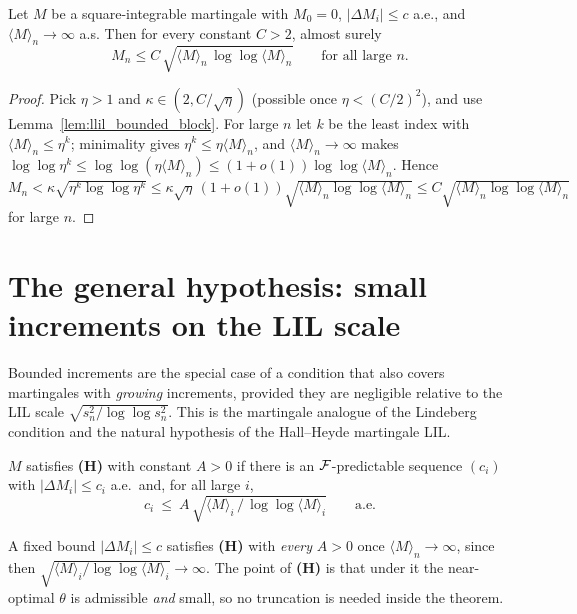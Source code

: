 \begin{theorem}\label{thm:llil_bounded}
\leanok
{}
Let $M$ be a square-integrable martingale with $M_0=0$, $|\Delta M_i|\le c$ a.e., and
$\langle M\rangle_n\to\infty$ a.s. Then for every constant $C>2$, almost surely
\[
  M_n\le C\,\sqrt{\langle M\rangle_n\,\log\log\langle M\rangle_n}\qquad
  \text{for all large }n.
\]
\end{theorem}
\begin{proof}\leanok
Pick $\eta>1$ and $\kappa\in(2,C/\sqrt\eta)$ (possible once $\eta<(C/2)^2$), and use
Lemma~\ref{lem:llil_bounded_block}. For large $n$ let $k$ be the least index with
$\langle M\rangle_n\le\eta^k$; minimality gives $\eta^k\le\eta\langle M\rangle_n$, and
$\langle M\rangle_n\to\infty$ makes $\log\log\eta^k\le\log\log(\eta\langle M\rangle_n)
\le(1+o(1))\log\log\langle M\rangle_n$. Hence
$M_n<\kappa\sqrt{\eta^k\log\log\eta^k}\le\kappa\sqrt\eta\,(1+o(1))
\sqrt{\langle M\rangle_n\log\log\langle M\rangle_n}\le C\sqrt{\langle M\rangle_n
\log\log\langle M\rangle_n}$ for large $n$.
\end{proof}

\section{The general hypothesis: small increments on the LIL scale}
\label{sec:llil_general}

Bounded increments are the special case of a condition that also covers martingales
with \emph{growing} increments, provided they are negligible relative to the LIL scale
$\sqrt{s_n^2/\log\log s_n^2}$. This is the martingale analogue of the Lindeberg
condition and the natural hypothesis of the Hall--Heyde martingale LIL.

\begin{definition}\label{def:llil_H}
$M$ satisfies \textbf{(H)} with constant $A>0$ if there is an $\mathcal{F}$-predictable
sequence $(c_i)$ with $|\Delta M_i|\le c_i$ a.e.\ and, for all large $i$,
\[
  c_i\ \le\ A\,\sqrt{\langle M\rangle_i\,/\,\log\log\langle M\rangle_i}\qquad\text{a.e.}
\]
\end{definition}

A fixed bound $|\Delta M_i|\le c$ satisfies \textbf{(H)} with \emph{every} $A>0$ once
$\langle M\rangle_n\to\infty$, since then $\sqrt{\langle M\rangle_i/\log\log\langle
M\rangle_i}\to\infty$. The point of \textbf{(H)} is that under it the near-optimal
$\theta$ is admissible \emph{and} small, so no truncation is needed inside the theorem.

